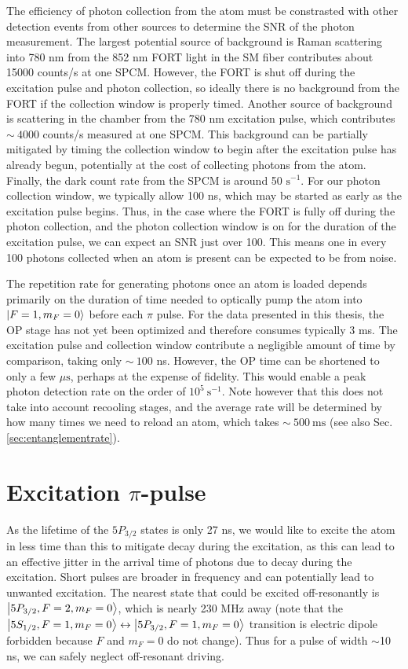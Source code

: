 The efficiency of photon collection from the atom must be constrasted with other detection events from other sources to determine the SNR of the photon measurement. The largest potential source of background is Raman scattering into 780 nm from the 852 nm FORT light in the SM fiber contributes about 15000 counts/s at one SPCM. However, the FORT is shut off during the excitation pulse and photon collection, so ideally there is no background from the FORT if the collection window is properly timed. Another source of background is scattering in the chamber from the 780 nm excitation pulse, which contributes $\sim~4000$ counts/s measured at one SPCM. This background can be partially mitigated by timing the collection window to begin after the excitation pulse has already begun, potentially at the cost of collecting photons from the atom. Finally, the dark count rate from the SPCM is around 50 $\mathrm{s}^{-1}$. For our photon collection window, we typically allow 100 ns, which may be started as early as the excitation pulse begins. Thus, in the case where the FORT is fully off during the photon collection, and the photon collection window is on for the duration of the excitation pulse, we can expect an SNR just over 100. This means one in every 100 photons collected when an atom is present can be expected to be from noise.

The repetition rate for generating photons once an atom is loaded depends primarily on the duration of time needed to optically pump the atom into $\ket{F=1,m_F=0}$ before each $\pi$ pulse. For the data presented in this thesis, the OP stage has not yet been optimized and therefore consumes typically 3 ms. The excitation pulse and collection window contribute a negligible amount of time by comparison, taking only $\sim~100$ ns. However, the OP time can be shortened to only a few $\mu \mathrm{s}$, perhaps at the expense of fidelity\cite{zhou2024long}. This would enable a peak photon detection rate on the order of $10^{5}~\mathrm{s}^{-1}$. Note however that this does not take into account recooling stages, and the average rate will be determined by how many times we need to reload an atom, which takes $\sim~500~\mathrm{ms}$ (see also Sec. \ref{sec:entanglementrate}).

\section{Excitation $\pi$-pulse}
As the lifetime of the $5P_{3/2}$ states is only 27 ns, we would like to excite the atom in less time than this to mitigate decay during the excitation, as this can lead to an effective jitter in the arrival time of photons due to decay during the excitation. Short pulses are broader in frequency and can potentially lead to unwanted excitation. The nearest state that could be excited off-resonantly is $\ket{5P_{3/2},F=2,m_F=0}$, which is nearly 230 MHz away (note that the $\ket{5S_{1/2},F=1,m_F=0} \leftrightarrow \ket{5P_{3/2},F=1,m_F=0}$ transition is electric dipole forbidden because $F$ and $m_F=0$ do not change). Thus for a pulse of width $\sim$10 ns, we can safely neglect off-resonant driving.

